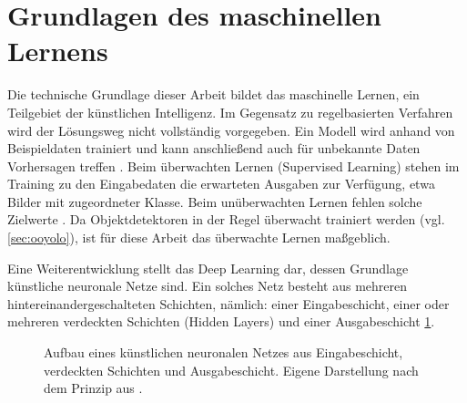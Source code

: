 \section{Grundlagen des maschinellen Lernens}
\label{sec:glmaschinelleslernen}
Die technische Grundlage dieser Arbeit bildet das maschinelle Lernen, ein Teilgebiet der künstlichen Intelligenz. Im Gegensatz zu regelbasierten Verfahren wird der Lösungsweg nicht vollständig vorgegeben. Ein Modell wird anhand von Beispieldaten trainiert und kann anschließend auch für unbekannte Daten Vorhersagen treffen \cite{goodfellow2016deep,lecun2015deep} . 
Beim überwachten Lernen (Supervised Learning) stehen im Training zu den Eingabedaten die erwarteten Ausgaben zur Verfügung, etwa Bilder mit zugeordneter Klasse. Beim unüberwachten Lernen fehlen solche Zielwerte \cite{goodfellow2016deep,lecun2015deep}. Da Objektdetektoren in der Regel überwacht trainiert werden (vgl. \cref{sec:ooyolo}), ist für diese Arbeit das überwachte Lernen maßgeblich. 

Eine Weiterentwicklung stellt das Deep Learning dar, dessen Grundlage künstliche neuronale Netze sind. Ein solches Netz besteht aus mehreren hintereinandergeschalteten Schichten, nämlich: einer Eingabeschicht, einer oder mehreren verdeckten Schichten (Hidden Layers) und einer Ausgabeschicht \cref{fig:nn}. 

\begin{figure}[H]
  \centering
  \resizebox{0.7\linewidth}{!}{}
  \caption[Aufbau eines neuronalen Netzes]{Aufbau eines künstlichen neuronalen Netzes aus Eingabeschicht, verdeckten Schichten und Ausgabeschicht. Eigene Darstellung nach dem Prinzip aus \cite{goodfellow2016deep}.}
  \label{fig:nn}
\end{figure}

